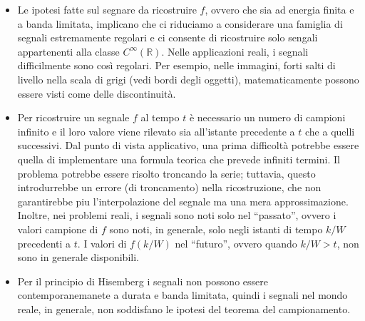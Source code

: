\begin{itemize}
    \item Le ipotesi fatte sul segnare da ricostruire $f$, ovvero che sia ad energia finita
        e a banda limitata, implicano che ci riduciamo a considerare una famiglia di segnali
        estremamente regolari e ci consente di ricostruire solo sengali appartenenti alla classe
        $C^{\infty}(\mathbb{R})$. Nelle applicazioni reali, i segnali difficilmente sono così
        regolari. Per esempio, nelle immagini, forti salti di livello nella scala di grigi
        (vedi bordi degli oggetti), matematicamente possono essere visti come delle 
        discontinuità.
    \item Per ricostruire un segnale $f$ al tempo $t$ è necessario un numero di campioni infinito
        e il loro valore viene rilevato sia all'istante precedente a $t$ che a quelli successivi.
        Dal punto di vista applicativo, una prima difficoltà potrebbe essere quella di
        implementare una formula teorica che prevede infiniti termini.
        Il problema potrebbe essere risolto troncando la serie; tuttavia, questo introdurrebbe
        un errore (di troncamento) nella ricostruzione, che non garantirebbe piu
        l’interpolazione del segnale ma una mera approssimazione.
        Inoltre, nei problemi reali, i segnali sono noti solo nel “passato”, ovvero i
        valori campione di $f$ sono noti, in generale, solo negli istanti di tempo $k/W$
        precedenti a $t$. I valori di $f(k/W)$ nel “futuro”, ovvero quando $k/W > t$,
        non sono in generale disponibili.
    \item Per il principio di Hisemberg i segnali non possono essere contemporanemanete 
        a durata e banda limitata, quindi i segnali nel mondo reale, in generale, non soddisfano
        le ipotesi del teorema del campionamento.
\end{itemize}

